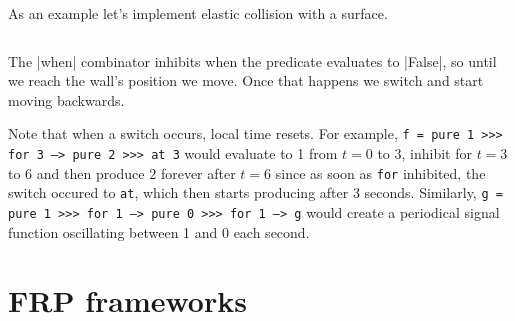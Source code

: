 \documentclass[pdftex,a4paper]{extarticle}
\begin{document}
\begin{itemize}
As an example let's implement elastic collision with a surface.
\inputminted[breaklines=true]{haskell}{Switch.hs}
The |when| combinator inhibits when the predicate evaluates to |False|, so until we reach the wall's position we move. Once that happens we switch and start moving backwards.

Note that when a switch occurs, local time resets. For example, \texttt{f = pure 1 >>> for 3 --> pure 2 >>> at 3} would evaluate to 1 from $t=0$ to $3$, inhibit for $t=3$ to $6$ and then produce $2$ forever after $t=6$ since as soon as \texttt{for} inhibited, the switch occured to \texttt{at}, which then starts producing after 3 seconds. Similarly, \texttt{g = pure 1 >>> for 1 --> pure 0 >>> for 1 --> g} would create a periodical signal function oscillating between 1 and 0 each second.
\end{itemize}

\section{FRP frameworks}
\label{sec:frameworks}
\end{document}

